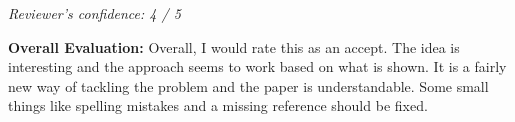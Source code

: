 \documentclass[11pt,a4paper]{article}
\begin{document}
\medskip

\textit{Reviewer's confidence: 4 / 5}

\textbf{Overall Evaluation:} Overall, I would rate this as an accept. The idea is
interesting and the approach seems to work based on what is shown. It is a fairly
new way of tackling the problem and the paper is understandable. Some small things
like spelling mistakes and a missing reference should be fixed.
\end{document}
